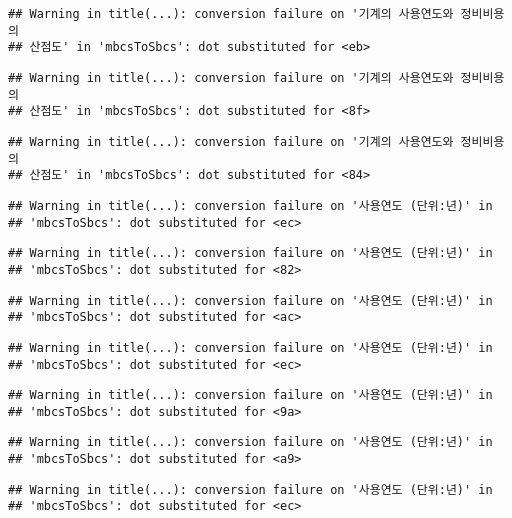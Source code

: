 \documentclass[
]{article}
\begin{document}
\begin{verbatim}
## Warning in title(...): conversion failure on '기계의 사용연도와 정비비용의
## 산점도' in 'mbcsToSbcs': dot substituted for <eb>
\end{verbatim}

\begin{verbatim}
## Warning in title(...): conversion failure on '기계의 사용연도와 정비비용의
## 산점도' in 'mbcsToSbcs': dot substituted for <8f>
\end{verbatim}

\begin{verbatim}
## Warning in title(...): conversion failure on '기계의 사용연도와 정비비용의
## 산점도' in 'mbcsToSbcs': dot substituted for <84>
\end{verbatim}

\begin{verbatim}
## Warning in title(...): conversion failure on '사용연도 (단위:년)' in
## 'mbcsToSbcs': dot substituted for <ec>
\end{verbatim}

\begin{verbatim}
## Warning in title(...): conversion failure on '사용연도 (단위:년)' in
## 'mbcsToSbcs': dot substituted for <82>
\end{verbatim}

\begin{verbatim}
## Warning in title(...): conversion failure on '사용연도 (단위:년)' in
## 'mbcsToSbcs': dot substituted for <ac>
\end{verbatim}

\begin{verbatim}
## Warning in title(...): conversion failure on '사용연도 (단위:년)' in
## 'mbcsToSbcs': dot substituted for <ec>
\end{verbatim}

\begin{verbatim}
## Warning in title(...): conversion failure on '사용연도 (단위:년)' in
## 'mbcsToSbcs': dot substituted for <9a>
\end{verbatim}

\begin{verbatim}
## Warning in title(...): conversion failure on '사용연도 (단위:년)' in
## 'mbcsToSbcs': dot substituted for <a9>
\end{verbatim}

\begin{verbatim}
## Warning in title(...): conversion failure on '사용연도 (단위:년)' in
## 'mbcsToSbcs': dot substituted for <ec>
\end{verbatim}
\end{document}
